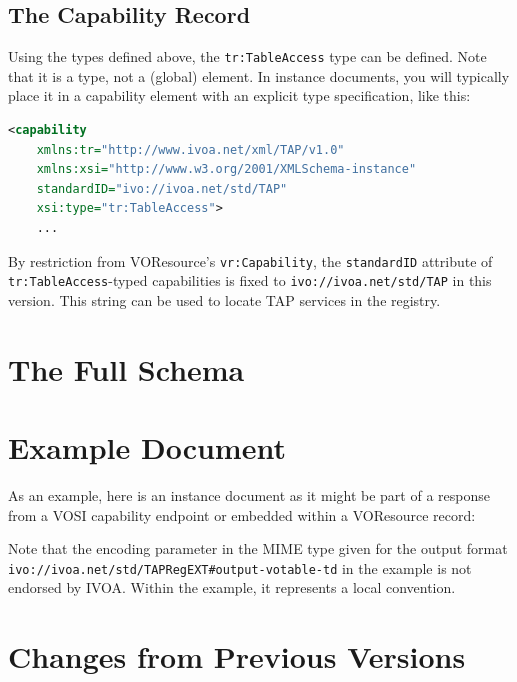 \documentclass{ivoa}
\begin{document}
\subsection{The Capability Record}

\label{caprec}

Using the types defined above, the 
\texttt{tr:TableAccess} type can be defined.  Note that
it is a type, not a (global) element.  In instance documents, you
will typically place it in a capability element with an explicit
type specification, like this:


\begin{lstlisting}[language=XML]
  <capability 
    xmlns:tr="http://www.ivoa.net/xml/TAP/v1.0" 
    xmlns:xsi="http://www.w3.org/2001/XMLSchema-instance" 
    standardID="ivo://ivoa.net/std/TAP" 
    xsi:type="tr:TableAccess">
    ...
\end{lstlisting}

By restriction from VOResource's \texttt{vr:Capability}, the 
\texttt{standardID} attribute of \texttt{tr:TableAccess}-typed 
capabilities is fixed to \texttt{ivo://ivoa.net/std/TAP} in this version.
This string can be used to locate TAP services in the registry.


\appendix


\section{The Full Schema}

\label{fullschem}



\section{Example Document}

\label{appB}

As an example, here is an instance document as it might be 
part of a response from a VOSI capability endpoint or embedded 
within a VOResource record:

Note that the encoding parameter in the MIME type given for the output format
\nolinkurl{ivo://ivoa.net/std/TAPRegEXT\#output-votable-td} in the example is not
endorsed by IVOA.  Within the example, it represents a local convention.




\section{Changes from Previous Versions}
\end{document}
